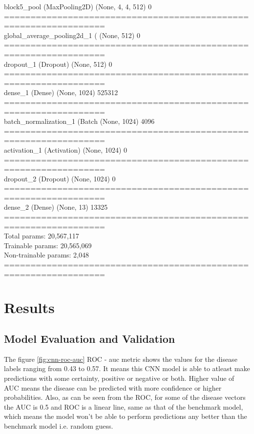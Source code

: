 \documentclass{article}
\begin{document}
{\begin{minipage}{\textwidth}
        block5\_pool (MaxPooling2D)   (None, 4, 4, 512)         0 \\ 
        ================================================================= \\ 
        global\_average\_pooling2d\_1 ( (None, 512)               0 \\ 
        ================================================================= \\ 
        dropout\_1 (Dropout)          (None, 512)               0 \\ 
        ================================================================= \\ 
        dense\_1 (Dense)              (None, 1024)              525312 \\ 
        ================================================================= \\ 
        batch\_normalization\_1 (Batch (None, 1024)              4096 \\ 
        ================================================================= \\ 
        activation\_1 (Activation)    (None, 1024)              0 \\ 
        ================================================================= \\ 
        dropout\_2 (Dropout)          (None, 1024)              0 \\ 
        ================================================================= \\ 
        dense\_2 (Dense)              (None, 13)                13325 \\ 
        ================================================================= \\ 
        Total params: 20,567,117 \\ 
        Trainable params: 20,565,069 \\ 
        Non-trainable params: 2,048 \\ 
        =================================================================
    \end{minipage}}

    \section{Results}
    \subsection{Model Evaluation and Validation}
    The figure \ref{fig:cnn-roc-auc} ROC - auc metric shows the values for the disease labels ranging from 0.43 to 0.57. It means this CNN model is able to atleast make predictions with some certainty, positive or negative or both. Higher value of AUC means the disease can be predicted with more confidence or higher probabilities. Also, as can be seen from the ROC, for some of the disease vectors the AUC is 0.5 and ROC is a linear line, same as that of the benchmark model, which means the model won't be able to perform predictions any better than the benchmark model i.e. random guess.
\end{document}
